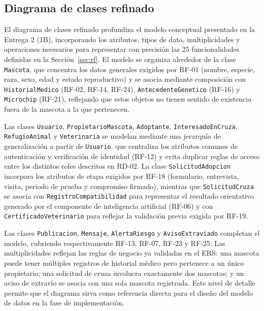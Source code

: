 \documentclass[journal,onecolumn]{IEEEtran}
\begin{document}
	\subsection{Diagrama de clases refinado}
	\label{sec:clases-refinado}
	
	El diagrama de clases refinado profundiza el modelo conceptual presentado en
	la Entrega 2 (1B), incorporando los atributos, tipos de dato,
	multiplicidades y operaciones necesarios para representar con precisión las
	25 funcionalidades definidas en la Sección~\ref{sec:rf}. El modelo se
	organiza alrededor de la clase \texttt{Mascota}, que concentra los datos
	generales exigidos por RF-01 (nombre, especie, raza, sexo, edad y estado
	reproductivo) y se asocia mediante composición con \texttt{HistorialMedico}
	(RF-02, RF-14, RF-24), \texttt{AntecedenteGenetico} (RF-16) y
	\texttt{Microchip} (RF-21), reflejando que estos objetos no tienen sentido
	de existencia fuera de la mascota a la que pertenecen.
	
	Las clases \texttt{Usuario}, \texttt{PropietarioMascota},
	\texttt{Adoptante}, \texttt{InteresadoEnCruza}, \texttt{RefugioAnimal} y
	\texttt{Veterinaria} se modelan mediante una jerarquía de generalización a
	partir de \texttt{Usuario}, que centraliza los atributos comunes de
	autenticación y verificación de identidad (RF-12) y evita duplicar reglas de
	acceso entre los distintos roles descritos en RD-02. La clase
	\texttt{SolicitudAdopcion} incorpora los atributos de etapa exigidos por
	RF-18 (formulario, entrevista, visita, periodo de prueba y compromiso
	firmado), mientras que \texttt{SolicitudCruza} se asocia con
	\texttt{RegistroCompatibilidad} para representar el resultado orientativo
	generado por el componente de inteligencia artificial (RF-06) y con
	\texttt{CertificadoVeterinario} para reflejar la validación previa exigida
	por RF-19.
	
	Las clases \texttt{Publicacion}, \texttt{Mensaje}, \texttt{AlertaRiesgo} y
	\texttt{AvisoExtraviado} completan el modelo, cubriendo respectivamente
	RF-13, RF-07, RF-23 y RF-25. Las multiplicidades reflejan las reglas de
	negocio ya validadas en el ERS: una mascota puede tener múltiples registros
	de historial médico pero pertenece a un único propietario; una solicitud de
	cruza involucra exactamente dos mascotas; y un aviso de extravío se asocia
	con una sola mascota registrada. Este nivel de detalle permite que el
	diagrama sirva como referencia directa para el diseño del modelo de datos en
	la fase de implementación.
	
\end{document}
